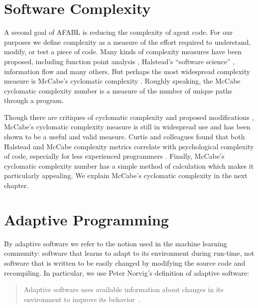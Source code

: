 



\section{Software Complexity}

A second goal of AFABL is reducing the complexity of agent code. For our purposes we define complexity as a measure of the effort required to understand, modify, or test a piece of code. Many kinds of complexity measures have been proposed, including function point analysis \cite{albrecht1979measuring}, Halstead's ``software science'' \cite{halstead1977elements}, information flow \cite{henry1981software} and many others. But perhaps the most widespread complexity measure is McCabe's cyclomatic complexity \cite{mccabe1976complexity,mccabe1989design}. Roughly speaking, the McCabe cyclomatic complexity number is a measure of the number of unique paths through a program.

Though there are critiques of cyclomatic complexity
\cite{gill1991cyclomatic} and proposed modifications \cite{weyuker1988evaluating}, McCabe's cyclomatic complexity measure is still in widespread use and has been shown to be a useful and valid measure. Curtis and colleagues found that both Halstead and McCabe complexity metrics correlate with psychological complexity of code, especially for less experienced programmers \cite{curtis1979measuring}. Finally, McCabe's cyclomatic complexity number has a simple method of calculation which makes it particularly appealing. We explain McCabe's cyclomatic complexity in the next chapter.

\section{Adaptive Programming}

By adaptive software we refer to the notion used in the machine learning community: software that learns to adapt to its environment during run-time, not software that is written to be easily changed by modifying the source code and recompiling.  In particular, we use Peter Norvig's definition of adaptive software:

\begin{quote}
Adaptive software uses available information about changes in its
environment to improve its behavior~\cite{norvig1998adaptive}.
\end{quote}

